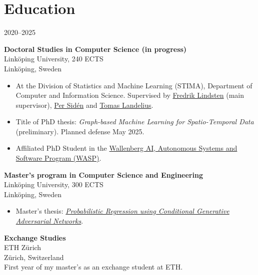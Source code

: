 \section*{Education}
\begin{labeling}{2020--2025}
\item [2020--2025] \textbf{Doctoral Studies in Computer Science (in progress)}\\
        Linköping University, 240 ECTS\\
        {\footnotesize Linköping, Sweden}
        \begin{itemize}
            \item At the Division of Statistics and Machine Learning (STIMA), Department of Computer and Information Science. Supervised by \href{https://lindsten.netlify.app/}{Fredrik Lindsten} (main supervisor), \href{https://scholar.google.se/citations?user=0UomzRIAAAAJ}{Per Sidén} and \href{https://www.smhi.se/en/research/research-departments/meteorology/tomas-landelius-1.4817}{Tomas Landelius}.
            \item Title of PhD thesis: \textit{Graph-based Machine Learning for Spatio-Temporal Data} (preliminary).
            Planned defense May 2025.
            \item Affiliated PhD Student in the \href{https://wasp-sweden.org/}{Wallenberg AI, Autonomous Systems and Software Program (WASP)}.
        \end{itemize}
    \item [2015--2020]
        \textbf{Master's program in Computer Science and Engineering}\\%
        Linköping University, 300 ECTS\\
        {\footnotesize Linköping, Sweden}
        \begin{itemize}
            \item Master's thesis: \href{http://urn.kb.se/resolve?urn=urn:nbn:se:liu:diva-166637}{\textit{Probabilistic Regression using Conditional Generative Adversarial Networks}}.
        \end{itemize}
    \item [2018--2019] \textbf{Exchange Studies}\\
        ETH Zürich\\
        {\footnotesize Zürich, Switzerland}\\
        First year of my master's as an exchange student at ETH.
\end{labeling}

